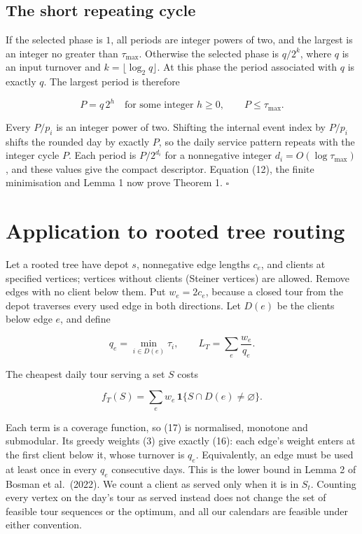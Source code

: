 \documentclass[
  british,
  11pt,
  a4paper,
]{article}
\begin{document}
\subsection{The short repeating cycle}\label{the-short-repeating-cycle}

If the selected phase is \(1\), all periods are integer powers of two,
and the largest is an integer no greater than \(\tau_{\max}\). Otherwise
the selected phase is \(q/2^k\), where \(q\) is an input turnover and
\(k=\lfloor\log_2q\rfloor\). At this phase the period associated with
\(q\) is exactly \(q\). The largest period is therefore

\[
P=q\,2^h\quad\text{for some integer }h\ge0,
\qquad P\le\tau_{\max}. \tag{15}
\]

Every \(P/p_i\) is an integer power of two. Shifting the internal event
index by \(P/p_i\) shifts the rounded day by exactly \(P\), so the daily
service pattern repeats with the integer cycle \(P\). Each period is
\(P/2^{d_i}\) for a nonnegative integer \(d_i=O(\log\tau_{\max})\), and
these values give the compact descriptor. Equation (12), the finite
minimisation and Lemma 1 now prove Theorem 1. \(\square\)

\section{Application to rooted tree
routing}\label{application-to-rooted-tree-routing}

Let a rooted tree have depot \(s\), nonnegative edge lengths \(c_e\),
and clients at specified vertices; vertices without clients (Steiner
vertices) are allowed. Remove edges with no client below them. Put
\(w_e=2c_e\), because a closed tour from the depot traverses every used
edge in both directions. Let \(D(e)\) be the clients below edge \(e\),
and define

\[
q_e=\min_{i\in D(e)}\tau_i,\qquad
L_T=\sum_e\frac{w_e}{q_e}. \tag{16}
\]

The cheapest daily tour serving a set \(S\) costs

\[
f_T(S)=\sum_e w_e\,\mathbf1\{S\cap D(e)\ne\varnothing\}. \tag{17}
\]

Each term is a coverage function, so (17) is normalised, monotone and
submodular. Its greedy weights (3) give exactly (16): each edge's weight
enters at the first client below it, whose turnover is \(q_e\).
Equivalently, an edge must be used at least once in every \(q_e\)
consecutive days. This is the lower bound in Lemma 2 of Bosman et
al.~(2022). We count a client as served only when it is in \(S_t\).
Counting every vertex on the day's tour as served instead does not
change the set of feasible tour sequences or the optimum, and all our
calendars are feasible under either convention.
\end{document}
